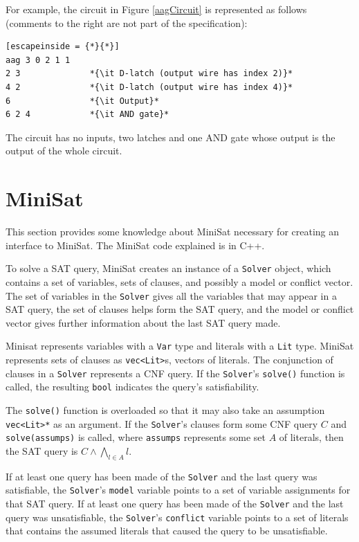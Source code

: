 \documentclass[12pt,a4paper,twoside,openright]{report}
\begin{document}
{{{For example, the circuit in Figure \ref{aagCircuit} is represented
as follows (comments to the right are not part of the specification):
\begin{lstlisting}[escapeinside = {*}{*}]
aag 3 0 2 1 1
2 3              *{\it D-latch (output wire has index 2)}*
4 2              *{\it D-latch (output wire has index 4)}*
6                *{\it Output}*
6 2 4            *{\it AND gate}*
\end{lstlisting}
The circuit has no inputs, two latches and one AND gate
whose output is the output of the whole circuit.
}


\section{MiniSat}
\label{prep:minisat}

This section provides some knowledge about MiniSat necessary
for creating an interface to MiniSat. The MiniSat code
explained is in C++.

To solve a SAT query, MiniSat creates an instance of a \verb,Solver, object,
which contains a set of variables, sets of clauses, and possibly a model or conflict vector.
The set of variables in the \verb,Solver, gives all the variables that may appear in
a SAT query, the set of clauses helps form the SAT query, and the model or conflict vector
gives further information about the last SAT query made.

Minisat represents variables with a \verb,Var, type and
literals with a \verb,Lit, type.
MiniSat represents sets of clauses as \verb,vec<Lit>,s,
vectors of literals. The conjunction of clauses in a \verb,Solver, represents a CNF query.
If the \verb,Solver,'s \verb,solve(), function is called,
the resulting \verb,bool, indicates the query's satisfiability.

The \verb,solve(), function is overloaded so that it may also take an assumption \verb,vec<Lit>*, as
an argument.
If the \verb,Solver,'s clauses form some CNF query $C$ and
\verb,solve(assumps), is called, where \verb,assumps, represents some set $A$ of literals,
then the SAT query is $C \wedge \bigwedge_{l \in A} l$.

If at least one query has been made of the \verb,Solver, and the last query was
satisfiable, the \verb,Solver,'s \verb,model, variable points to a set of variable assignments
for that SAT query.
If at least one query has been made of the \verb,Solver, and the last query was
unsatisfiable, the \verb,Solver,'s \verb,conflict, variable points to a set of literals that
contains the assumed literals that caused the query to be unsatisfiable.

}}
\end{document}
